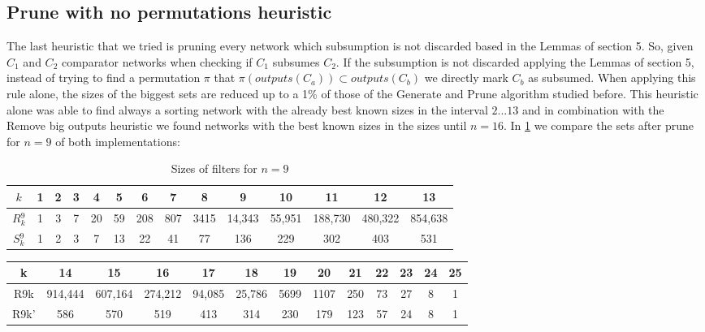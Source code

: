 \documentclass[../main.tex]{subfiles}
\begin{document}
	\subsection{Prune with no permutations heuristic}
	The last heuristic that we tried is pruning every network which subsumption is not discarded based in the Lemmas of section 5. So, given $C_1$ and $C_2$ comparator networks when checking if $C_1$ subsumes $C_2$. If the subsumption is not discarded applying the Lemmas of section 5, instead of trying to find a permutation $\pi$ that $\pi(outputs(C_a)) \subset outputs(C_b)$ we directly mark $C_b$ as subsumed. When applying this rule alone, the sizes of the biggest sets are reduced up to a 1\% of those of the Generate and Prune algorithm studied before. This heuristic alone was able to find always a sorting network with the already best known sizes in the interval $2...13$ and in combination with the Remove big outputs heuristic we found networks with the best known sizes in the sizes until $n=16$. In \ref{table:noPermutations} we compare the sets after prune for $n=9$ of both implementations:
	
	\begin{table}[H]
		\begin{tabular}{|c c c c c c c c c c c c c c|}
			\hline
			$k$ & 1 & 2 & 3 & 4 & 5 & 6 & 7 & 8 & 9 & 10 & 11 & 12 & 13  \\
			\hline\hline
			$R{^9_k}$& 1 & 3 & 7 & 20 & 59 & 208 & 807 & 3415 & 14,343 & 55,951 & 188,730 & 480,322 & 854,638 \\ 
			\hline
			$S{^9_k}$ & 1 & 2 & 3 & 7 & 13 & 22 & 41 & 77 & 136 & 229 & 302 & 403 & 531 \\
			\hline
		\end{tabular}
		\caption{Sizes of filters for $n=9$}
		\label{table:noPermutations}
	\end{table}
	\begin{table}[H]
		\begin{tabular}{|c c c c c c c c c c c c c|}
			\hline
			k & 14 & 15 & 16 & 17 & 18 & 19 & 20 & 21 & 22 & 23 & 24 & 25  \\
			\hline\hline
			R9k & 914,444 & 607,164 & 274,212 & 94,085 & 25,786 & 5699 & 1107 & 250 & 73 & 27 & 8 & 1 \\ 
			\hline
			R9k' & 586 & 570 & 519 & 413 & 314 & 230 & 179 & 123 & 57 & 24 & 8 & 1 \\
			\hline
		\end{tabular}
	\end{table}
	
\end{document}
